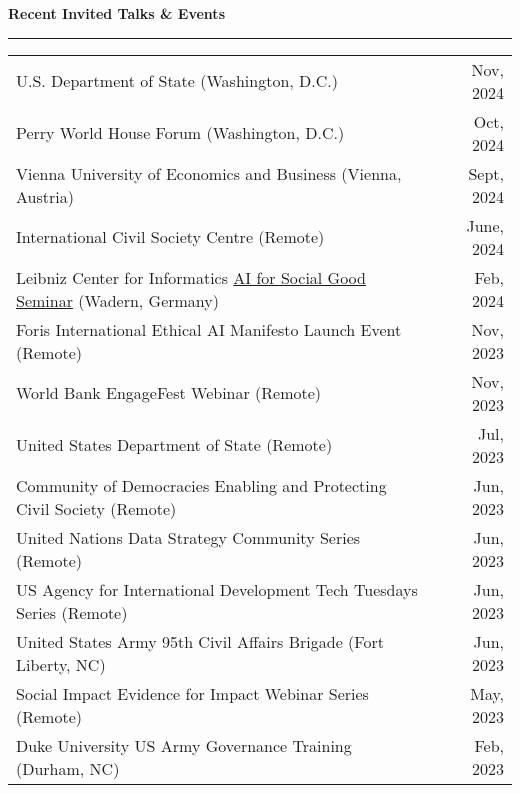\documentclass[11pt]{article}
\begin{document}
\textbf{\large Recent Invited Talks \& Events}\\
\rule[3mm]{\textwidth}{.2pt}
\noindent\begin{tabular*}{\textwidth}{@{}l@{\extracolsep{\fill}}r@{}}
U.S. Department of State (Washington, D.C.) & Nov, 2024\\

Perry World House Forum (Washington, D.C.) & Oct, 2024\\

Vienna University of Economics and Business (Vienna, Austria) & Sept, 2024\\

International Civil Society Centre (Remote) & June, 2024\\

Leibniz Center for Informatics \href{https://drops.dagstuhl.de/storage/04dagstuhl-reports/volume14/issue02/24082/DagRep.14.2.182/DagRep.14.2.182.pdf}{AI for Social Good Seminar} (Wadern, Germany) & Feb, 2024\\

Foris International Ethical AI Manifesto Launch Event (Remote) & Nov, 2023\\

World Bank EngageFest Webinar (Remote) & Nov, 2023\\

United States Department of State (Remote) & Jul, 2023\\

Community of Democracies Enabling and Protecting Civil Society (Remote) & Jun, 2023\\

United Nations Data Strategy Community Series (Remote) & Jun, 2023\\

US Agency for International Development Tech Tuesdays Series (Remote) & Jun, 2023\\

United States Army 95th Civil Affairs Brigade (Fort Liberty, NC) & Jun, 2023\\

Social Impact Evidence for Impact Webinar Series (Remote) & May, 2023\\


Duke University US Army Governance Training (Durham, NC) & Feb, 2023\\


\end{tabular*}
\end{document}
